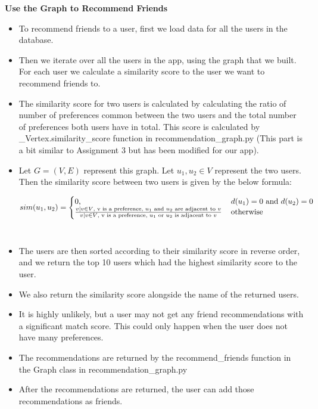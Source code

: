 \documentclass[11pt]{report}
\begin{document}
\newpage 

{\bf Use the Graph to Recommend Friends}

\begin{itemize}
    \item To recommend friends to a user, first we load data for all the users in the database. \\
    
    \item Then we iterate over all the users in the app, using the graph that we built. For each user we calculate a similarity score to the user we want to recommend friends to.\\
    
    \item The similarity score for two users is calculated by calculating the ratio of number of preferences common between the two users and the total number of preferences both users have in total. This score is calculated by \_Vertex.similarity\_score function in recommendation\_graph.py (This part is a bit similar to Assignment 3 but has been modified for our app).\\
    
    \item Let $G = (V, E)$ represent this graph. Let $u_1, u_2 \in V$ represent the two users. Then the similarity score between two users is given by the below formula:
    

     
 \[
  sim(u_1,u_2) = \left\{
     \begin{array}{@{}l@{\thinspace}l}
       \text{0,} & \quad d(u_1) = 0 \text{ and } d(u_2) = 0 \\
       \frac{v | v \in V \text{, v is a preference, } u_1 \text{ and } u_2 \text{ are adjacent to } v}{v | v \in V \text{, v is a preference, } u_1 \text{ or } u_2 \text{ is adjacent to } v} & \quad \text{otherwise}
       
     \end{array}
   \right.
\]~\\

\item The users are then sorted according to their similarity score in reverse order, and we return the top 10 users which had the highest similarity score to the user. \\

\item We also return the similarity score alongside the name of the returned users. \\

\item It is highly unlikely, but a user may not get any friend recommendations with a significant match score. This could only happen when the user does not have many preferences. 
\item The recommendations are returned by the recommend\_friends function in the Graph class in recommendation\_graph.py \\

\item After the recommendations are returned, the user can add those recommendations as friends. 
\end{itemize}
\end{document}
